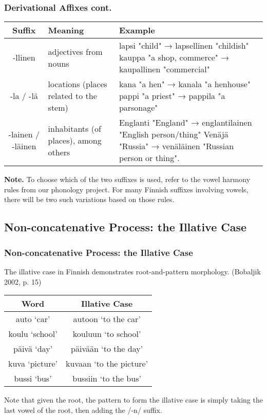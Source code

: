 \documentclass{beamer}
\begin{document}
\begin{frame}
	\frametitle{Derivational Affixes cont.}
    {\scriptsize
    \begin{center}
        \begin{tabular}{|c|p{3cm}|p{5cm}|}
            \hline
            \textbf{Suffix} & \textbf{Meaning} & \textbf{Example}\\\hline
            -llinen &
                adjectives from nouns &
                lapsi "child" → lapsellinen "childish" \newline
                kauppa "a shop, commerce" → kaupallinen "commercial" \\\hline
            -la / -l\"a &
                locations (places related to the stem) &
                kana "a hen" → kanala "a henhouse" \newline
                pappi "a priest" → pappila "a parsonage" \\\hline
            -lainen / -l\"ainen &
                inhabitants (of places), among others &
                Englanti "England" → englantilainen "English person/thing" \newline
                Ven\"aj\"a "Russia" → ven\"al\"ainen "Russian person or thing". \\\hline
        \end{tabular}
    \end{center}
    }
    \textbf{Note.} To choose which of the two suffixes is used, refer to the vowel harmony rules from our phonology project. For many Finnish suffixes involving vowels, there will be two such variations based on those rules.
\end{frame}

\subsection{Non-concatenative Process: the Illative Case}
\begin{frame}
  \frametitle{Non-concatenative Process: the Illative Case}
    The illative case in Finnish demonstrates root-and-pattern morphology. (Bobaljik 2002, p. 15)
    \begin{center}
        \begin{tabular}{ c c }
            \hline\hline
            \textbf{Word} & \textbf{Illative Case}\\\hline\hline
            auto `car' &
                autoon `to the car' \\
            koulu `school' &
                kouluun `to school' \\
            p\"aiv\"a `day' &
                p\"aiv\"a\"an `to the day' \\
            kuva `picture' &
                kuvaan `to the picture' \\
            bussi `bus' &
                bussiin `to the bus' \\\hline
        \end{tabular}
    \end{center}
    Note that given the root, the pattern to form the illative case is simply taking the last vowel of the root, then adding the /-n/ suffix.
\end{frame}
\end{document}
